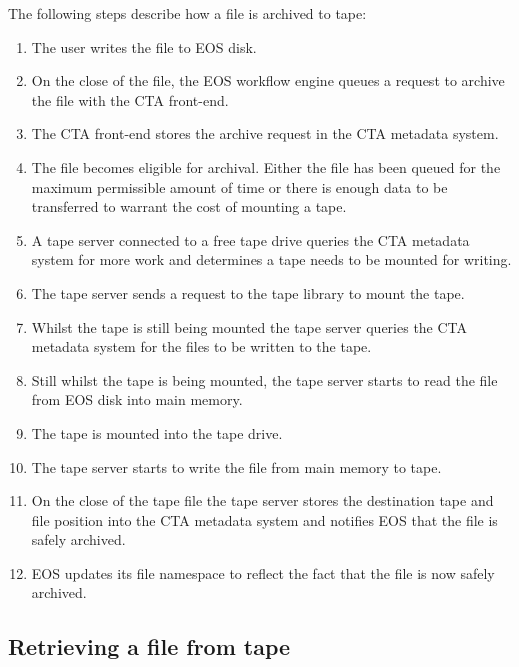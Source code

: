 \documentclass[a4paper]{jpconf}
\begin{document}
The following steps describe how a file is archived to tape:
\begin{enumerate}
  \item The user writes the file to EOS disk.
  \item On the close of the file, the EOS workflow engine queues a request to
  archive the file with the CTA front-end.
  \item The CTA front-end stores the archive request in the CTA metadata system.
  \item The file becomes eligible for archival.  Either the file has been
  queued for the maximum permissible amount of time or there is enough data to
  be transferred to warrant the cost of mounting a tape.
  \item A tape server connected to a free tape drive queries the CTA metadata
  system for more work and determines a tape needs to be mounted for writing.
  \item The tape server sends a request to the tape library to mount the tape.
  \item Whilst the tape is still being mounted the tape server queries the CTA
  metadata system for the files to be written to the tape.
  \item Still whilst the tape is being mounted, the tape server starts to read
  the file from EOS disk into main memory.
  \item The tape is mounted into the tape drive.
  \item The tape server starts to write the file from main memory to tape.
  \item On the close of the tape file the tape server stores the destination
  tape and file position into the CTA metadata system and notifies EOS that the
  file is safely archived.
  \item EOS updates its file namespace to reflect the fact that the file is now
  safely archived.
\end{enumerate}

\subsection{Retrieving a file from tape}
\end{document}
